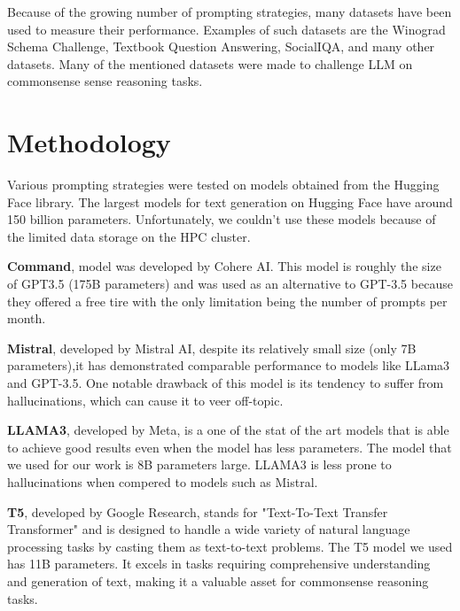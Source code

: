 \documentclass[fleqn,moreauthors,10pt]{ds_report}
\begin{document}
    Because of the growing number of prompting strategies, many datasets have been used to measure their performance. Examples of such datasets are the Winograd Schema Challenge\cite{levesque2012winograd}, Textbook Question Answering\cite{Kembhavi2017AreYS},  SocialIQA\cite{sap2019socialiqa}, and many other datasets. Many of the mentioned datasets were made to challenge LLM on commonsense sense reasoning tasks.

\section*{Methodology}

Various prompting strategies were tested on models obtained from the Hugging Face library. The largest models for text generation on Hugging Face have around 150 billion parameters. Unfortunately, we couldn't use these models because of the limited data storage on the HPC cluster.

\textbf{Command}, model was developed by Cohere AI. This model is roughly the size of GPT3.5 (175B parameters) and was used as an alternative to GPT-3.5 because they offered a free tire with the only limitation being the number of prompts per month.

\textbf{Mistral}, developed by Mistral AI, despite its relatively small size (only 7B parameters),it has demonstrated comparable performance to models like LLama3 and GPT-3.5. One notable drawback of this model is its tendency to suffer from hallucinations, which can cause it to veer off-topic.

\textbf{LLAMA3}, developed by Meta, is a one of the stat of the art models that is able to achieve good results even when the model has less parameters. The model that we used for our work is 8B parameters large. LLAMA3 is less prone to hallucinations when compered to models such as Mistral.

\textbf{T5}, developed by Google Research, stands for "Text-To-Text Transfer Transformer" and is designed to handle a wide variety of natural language processing tasks by casting them as text-to-text problems. The T5 model we used has 11B parameters. It excels in tasks requiring comprehensive understanding and generation of text, making it a valuable asset for commonsense reasoning tasks. 
\end{document}

